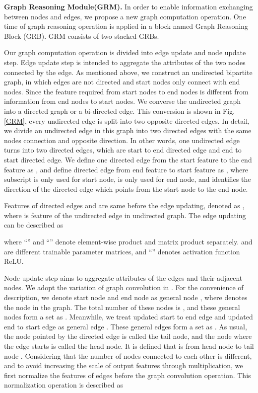 \documentclass[runningheads]{llncs}
\begin{document}
\noindent\textbf{Graph Reasoning Module(GRM).}
In order to enable information exchanging between nodes and edges, we propose a new graph computation operation. One time of graph reasoning operation is applied in a block named Graph Reasoning Block (GRB). GRM consists of two stacked GRBs.

Our graph computation operation is divided into edge update and node update step. Edge update step is intended to aggregate the attributes of the two nodes connected by the edge. As mentioned above, we construct an undirected bipartite graph, in which edges are not directed and start nodes only connect with end nodes. Since the feature required from start nodes to end nodes is different from information from end nodes to start nodes. We converse the undirected graph into a directed graph or a bi-directed edge. This conversion is shown in Fig.\ref{GRM}, every undirected edge is split into two opposite directed edges. In detail, we divide an undirected edge in this graph into two directed edges with the same nodes connection and opposite direction. In other words, one undirected edge turns into two directed edges, which are start to end directed edge and end to start directed edge. We define one directed edge from the  start feature   to the  end feature  as , and define directed edge from end feature  to start feature  as , where subscript  is only used for start node,  is only used for end node, and  identifies the direction of the directed edge which points from the  start node to the  end node.

Features of directed edges  and  are same before the edge updating, denoted as , where  is feature of the undirected edge in undirected graph. The edge updating can be described as

where ``'' and ``'' denote element-wise product and matrix product separately.  and  are different trainable parameter matrices, and ``'' denotes activation function ReLU.

Node update step aims to aggregate attributes of the edges and their adjacent nodes. We adopt the variation of graph convolution in \cite{EGGN}. For the convenience of description, we denote start node and end node as general node , where  denotes the  node in the graph.  The total number of these nodes is , and these general nodes form a set as . Meanwhile, we treat updated start to end edge  and updated end to start edge  as general edge . These general edges form a set as . As usual, the node pointed by the directed edge is called the tail node, and the node where the edge starts is called the head node. It is defined that  is from head node  to tail node . Considering that the number of nodes connected to each other is different, and to avoid increasing the scale of output features through multiplication, we first normalize the features of edges before the graph convolution operation. This normalization operation is described as
\end{document}
